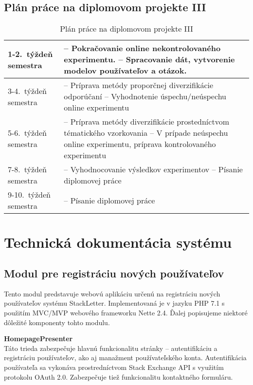 \newpage
\section{Plán práce na diplomovom projekte III}\label{apx:dp3plan}

\begin{table}[h]
\centering
\caption{Plán práce na diplomovom projekte III}
\begin{tabular}{|m{2.3cm}|m{12cm}|}
\hline
1-2.~týždeň semestra & -- Pokračovanie online nekontrolovaného experimentu.
			  \newline -- Spracovanie dát, vytvorenie modelov používateľov a otázok. \\ \hline
3-4.~týždeň semestra & -- Príprava metódy proporčnej diverzifikácie odporúčaní
			  \newline -- Vyhodnotenie úspechu/neúspechu online experimentu \\ \hline
5-6.~týždeň semestra & -- Príprava metódy diverzifikácie prostedníctvom tématického vzorkovania
              \newline -- V prípade neúspechu online experimentu, príprava kontrolovaného experimentu \\ \hline
7-8.~týždeň semestra & -- Vyhodnocovanie výsledkov experimentov
			  \newline -- Písanie diplomovej práce \\ \hline
9-10.~týždeň semestra & -- Písanie diplomovej práce \\ \hline
\end{tabular}
\end{table}


\chapter{Technická dokumentácia systému}\label{tech-doc}

\section{Modul pre registráciu nových používateľov}

Tento modul predstavuje webovú aplikáciu určenú na registráciu nových používateľov systému StackLetter. Implementovaná je
v jazyku PHP 7.1 s použitím MVC/MVP webového frameworku Nette 2.4. Ďalej popisujeme niektoré dôležité komponenty tohto modulu.

\textbf{HomepagePresenter}\\
Táto trieda zabezpečuje hlavnú funkcionalitu stránky -- autentifikáciu a registráciu používateľov, ako aj manažment
používateľského konta. Autentifikácia používateľa sa vykonáva prostredníctvom Stack Exchange API s využitím protokolu OAuth 2.0.
Zabezpečuje tiež funkcionalitu kontaktného formuláru.

